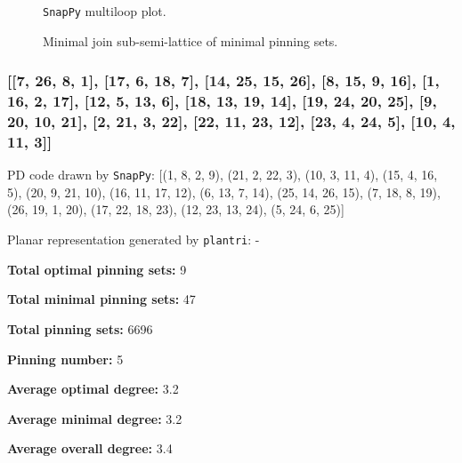 \documentclass{article}%
\begin{document}
\begin{multicols}{2}
\begin{figure}[H]
\centering

\caption{\texttt{SnapPy} multiloop plot.}
\label{fig:tex/img/[[19, 26, 20, 1], [18, 7, 19, 8], [14, 25, 15, 26], [20, 15, 21, 16], [1, 9, 2, 8], [2, 17, 3, 18], [13, 6, 14, 7], [24, 5, 25, 6], [21, 11, 22, 10], [16, 10, 17, 9], [3, 22, 4, 23], [23, 12, 24, 13],.svg}
\end{figure}
\columnbreak

\begin{figure}[H]
\centering
\scalebox{0.8}{}
\caption{Minimal join sub-semi-lattice of minimal pinning sets.}
\label{fig:tex/img/[[19, 26, 20, 1], [18, 7, 19, 8], [14, 25, 15, 26], [20, 15, 21, 16], [1, 9, 2, 8], [2, 17, 3, 18], [13, 6, 14, 7], [24, 5, 25, 6], [21, 11, 22, 10], [16, 10, 17, 9], [3, 22, 4, 23], [23, 12, 24, 13],.pgf}
\end{figure}
\end{multicols}

\newpage

\subsubsection{[[7, 26, 8, 1], [17, 6, 18, 7], [14, 25, 15, 26], [8, 15, 9, 16], [1, 16, 2, 17], [12, 5, 13, 6], [18, 13, 19, 14], [19, 24, 20, 25], [9, 20, 10, 21], [2, 21, 3, 22], [22, 11, 23, 12], [23, 4, 24, 5], [10, 4, 11, 3]]}

{\small\noindent PD code drawn by \texttt{SnapPy}: [(1, 8, 2, 9), (21, 2, 22, 3), (10, 3, 11, 4), (15, 4, 16, 5), (20, 9, 21, 10), (16, 11, 17, 12), (6, 13, 7, 14), (25, 14, 26, 15), (7, 18, 8, 19), (26, 19, 1, 20), (17, 22, 18, 23), (12, 23, 13, 24), (5, 24, 6, 25)]}

{\small\noindent Planar representation generated by \texttt{plantri}: -}

\begin{multicols}{2}
{\normalsize \noindent\textbf{Total optimal pinning sets:} 9

\noindent\textbf{Total minimal pinning sets:} 47

\noindent\textbf{Total pinning sets:} 6696

\noindent\textbf{Pinning number:} 5

}
\columnbreak

{\normalsize \noindent\textbf{Average optimal degree:} 3.2

\noindent\textbf{Average minimal degree:} 3.2

\noindent\textbf{Average overall degree:} 3.4

}
\end{multicols}
\end{document}
